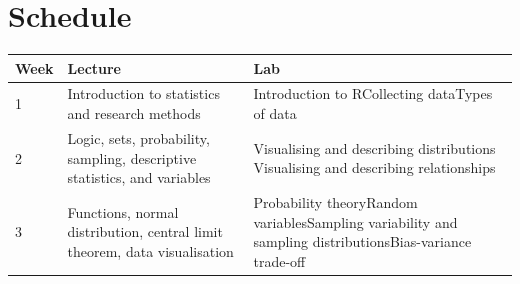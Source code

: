 \documentclass[]{book}
\begin{document}
\hypertarget{schedule}{%
\section*{Schedule}\label{schedule}}

\begin{longtable}[]{@{}lll@{}}
\toprule
\begin{minipage}[b]{0.30\columnwidth}\raggedright
Week\strut
\end{minipage} & \begin{minipage}[b]{0.30\columnwidth}\raggedright
Lecture\strut
\end{minipage} & \begin{minipage}[b]{0.30\columnwidth}\raggedright
Lab\strut
\end{minipage}\tabularnewline
\midrule
\endhead
\begin{minipage}[t]{0.30\columnwidth}\raggedright
1\strut
\end{minipage} & \begin{minipage}[t]{0.30\columnwidth}\raggedright
Introduction to statistics and research methods\strut
\end{minipage} & \begin{minipage}[t]{0.30\columnwidth}\raggedright
Introduction to RCollecting dataTypes of data\strut
\end{minipage}\tabularnewline
\begin{minipage}[t]{0.30\columnwidth}\raggedright
2\strut
\end{minipage} & \begin{minipage}[t]{0.30\columnwidth}\raggedright
Logic, sets, probability, sampling, descriptive statistics, and variables\strut
\end{minipage} & \begin{minipage}[t]{0.30\columnwidth}\raggedright
Visualising and describing distributions Visualising and describing relationships\strut
\end{minipage}\tabularnewline
\begin{minipage}[t]{0.30\columnwidth}\raggedright
3\strut
\end{minipage} & \begin{minipage}[t]{0.30\columnwidth}\raggedright
Functions, normal distribution, central limit theorem, data visualisation\strut
\end{minipage} & \begin{minipage}[t]{0.30\columnwidth}\raggedright
Probability theoryRandom variablesSampling variability and sampling distributionsBias-variance trade-off\strut

\end{minipage}
\end{longtable}
\end{document}
